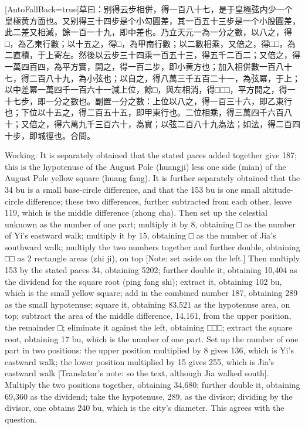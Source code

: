 \documentclass[11pt]{article}
\newcommand{\zhsmall}{\footnotesize\color{black!70}}
\newcommand{\unitlabel}[1]{\marginpar{\raggedleft\tiny\color{gray}#1}}
\newenvironment{unitzh}{\par\CJKfontspec{Noto Serif CJK SC}[AutoFallBack=true]\large\linespread{1.25}\selectfont}{\par}
\newenvironment{uniten}{\par\small\color{black!85}}{\par\medskip}
\begin{document}
\begin{unitzh}\unitlabel{ceyuan-032.20}草曰：别得云步相併，得一百八十七，是于皇極弦内少一个皇極黄方靣也。又别得三十四步是个小勾圓差，其一百五十三步是一个小股圓差，此二差又相減，餘一百一十九，即中差也。乃立天元一為一分之數，以八之，得□，為乙東行數；以十五之，得□，為甲南行數；以二數相乘，又倍之，得□□，為二直積，于上{\zhsmall 寄左}。然後以云步三十四乘一百五十三，得五千二百二；又倍之，得一萬四百四，為平方實，開之，得一百二步，即小黄方也；加入相併數一百八十七，得二百八十九，為小弦也；以自之，得八萬三千五百二十一，為弦冪，于上；以中差冪一萬四千一百六十一減上位，餘□，與左相消，得□□□，平方開之，得一十七步，即一分之數也。副置一分之數：上位以八之，得一百三十六，即乙東行也；下位以十五之，得二百五十五，即甲東行也。二位相乘，得三萬四千六百八十；又倍之，得六萬九千三百六十，為實；以弦二百八十九為法；如法，得二百四十步，即城徑也。合問。\end{unitzh}
\begin{uniten}Working: It is separately obtained that the stated paces added together give 187; this is the hypotenuse of the August Pole (huangji) less one side (mian) of the August Pole yellow square (huang fang). It is further separately obtained that the 34 bu is a small base-circle difference, and that the 153 bu is one small altitude-circle difference; these two differences, further subtracted from each other, leave 119, which is the middle difference (zhong cha). Then set up the celestial unknown as the number of one part; multiply it by 8, obtaining □ as the number of Yi's eastward walk; multiply it by 15, obtaining □ as the number of Jia's southward walk; multiply the two numbers together and further double, obtaining □□ as 2 rectangle areas (zhi ji), on top [Note: set aside on the left.] Then multiply 153 by the stated paces 34, obtaining 5202; further double it, obtaining 10,404 as the dividend for the square root (ping fang shi); extract it, obtaining 102 bu, which is the small yellow square; add in the combined number 187, obtaining 289 as the small hypotenuse; square it, obtaining 83,521 as the hypotenuse area, on top; subtract the area of the middle difference, 14,161, from the upper position, the remainder □; eliminate it against the left, obtaining □□□; extract the square root, obtaining 17 bu, which is the number of one part. Set up the number of one part in two positions: the upper position multiplied by 8 gives 136, which is Yi's eastward walk; the lower position multiplied by 15 gives 255, which is Jia's eastward walk [Translator's note: so the text, although Jia walked south]. Multiply the two positions together, obtaining 34,680; further double it, obtaining 69,360 as the dividend; take the hypotenuse, 289, as the divisor; dividing by the divisor, one obtains 240 bu, which is the city's diameter. This agrees with the question.\end{uniten}
\end{document}
